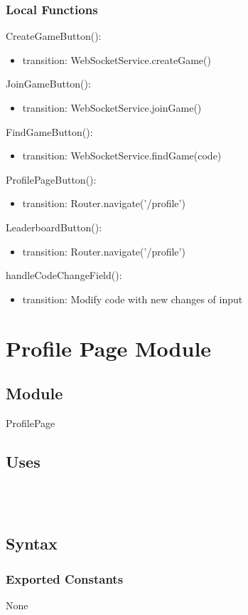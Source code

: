 \documentclass[12pt, titlepage]{article}
\begin{document}
\subsubsection{Local Functions}
\noindent CreateGameButton(): 
\begin{itemize}
\item transition: WebSocketService.createGame()
\end{itemize}
\noindent JoinGameButton():
\begin{itemize}
\item transition: WebSocketService.joinGame()
\end{itemize}
\noindent FindGameButton():
\begin{itemize}
\item transition: WebSocketService.findGame(code)
\end{itemize}
\noindent ProfilePageButton():
\begin{itemize}
\item transition: Router.navigate('/profile')
\end{itemize}
\noindent LeaderboardButton():
\begin{itemize}
\item transition: Router.navigate('/profile')
\end{itemize}
\noindent handleCodeChangeField():
\begin{itemize}
\item transition: Modify code with new changes of input
\end{itemize}
\newpage



\section{Profile Page Module} \label{ProfilePage} 
\subsection{Module}
ProfilePage
\subsection{Uses}
\\
 \\

\subsection{Syntax}
\subsubsection{Exported Constants}
None
\end{document}
